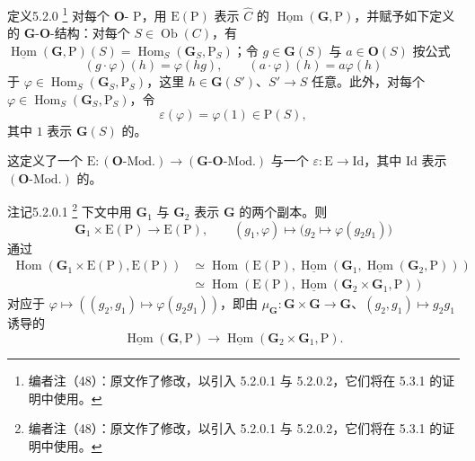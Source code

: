 \begin{SGAresult}{定义}{5.2.0}
\footnote{编者注（48）：原文作了修改，以引入 5.2.0.1 与 5.2.0.2，它们将在 5.3.1 的证明中使用。} 对每个 $\mathbf O$- $\mathrm P$，用 $\mathrm E(\mathrm P)$ 表示 $\widehat C$ 的 $\underline{\operatorname{Hom}}(\mathbf G,\mathrm P)$，并赋予如下定义的 $\mathbf G$-$\mathbf O$-结构：对每个 $S\in\operatorname{Ob}(C)$，有 $\underline{\operatorname{Hom}}(\mathbf G,\mathrm P)(S)=\operatorname{Hom}_S(\mathbf G_S,\mathrm P_S)$；令 $g\in\mathbf G(S)$ 与 $a\in\mathbf O(S)$ 按公式
\[
(g\cdot\varphi)(h)=\varphi(hg),\qquad(a\cdot\varphi)(h)=a\varphi(h)
\]
于 $\varphi\in\operatorname{Hom}_S(\mathbf G_S,\mathrm P_S)$，这里 $h\in\mathbf G(S')$、$S'\to S$ 任意。此外，对每个 $\varphi\in\operatorname{Hom}_S(\mathbf G_S,\mathrm P_S)$，令
\[
\varepsilon(\varphi)=\varphi(1)\in\mathrm P(S),
\]
其中 $1$ 表示 $\mathbf G(S)$ 的。
\end{SGAresult}
这定义了一个 $\mathrm E:(\mathbf O\text{-}\mathrm{Mod.})\to(\mathbf G\text{-}\mathbf O\text{-}\mathrm{Mod.})$ 与一个 $\varepsilon:\mathrm E\to\mathrm{Id}$，其中 $\mathrm{Id}$ 表示 $(\mathbf O\text{-}\mathrm{Mod.})$ 的。

\begin{SGAresult}{注记}{5.2.0.1}
\footnote{编者注（48）：原文作了修改，以引入 5.2.0.1 与 5.2.0.2，它们将在 5.3.1 的证明中使用。} 下文中用 $\mathbf G_1$ 与 $\mathbf G_2$ 表示 $\mathbf G$ 的两个副本。则
\[
\mathbf G_1\times\mathrm E(\mathrm P)\longrightarrow\mathrm E(\mathrm P),\qquad(g_1,\varphi)\longmapsto\bigl(g_2\longmapsto\varphi(g_2g_1)\bigr)
\]
通过
\[
\begin{aligned}
\operatorname{Hom}(\mathbf G_1\times\mathrm E(\mathrm P),\mathrm E(\mathrm P))
&\simeq\operatorname{Hom}(\mathrm E(\mathrm P),\underline{\operatorname{Hom}}(\mathbf G_1,\underline{\operatorname{Hom}}(\mathbf G_2,\mathrm P)))\\
&\simeq\operatorname{Hom}(\mathrm E(\mathrm P),\underline{\operatorname{Hom}}(\mathbf G_2\times\mathbf G_1,\mathrm P))
\end{aligned}
\]
对应于 $\varphi\mapsto((g_2,g_1)\mapsto\varphi(g_2g_1))$，即由 $\mu_{\mathbf G}:\mathbf G\times\mathbf G\to\mathbf G$、$(g_2,g_1)\mapsto g_2g_1$ 诱导的
\[
\underline{\operatorname{Hom}}(\mathbf G,\mathrm P)\longrightarrow\underline{\operatorname{Hom}}(\mathbf G_2\times\mathbf G_1,\mathrm P).
\]
\end{SGAresult}

